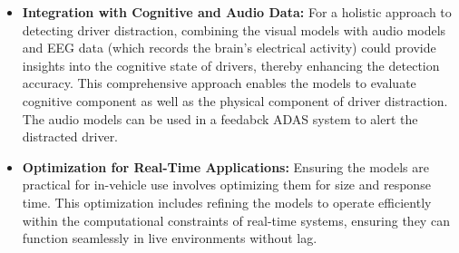 \begin{itemize}
    \item \textbf{Integration with Cognitive and Audio Data:} For a holistic approach to detecting driver distraction, combining the visual models with audio models and EEG data (which records the brain's electrical activity) could provide insights into the cognitive state of drivers, thereby enhancing the detection accuracy. This comprehensive approach enables the models to evaluate cognitive component as well as the physical component of driver distraction. The audio models can be used in a feedabck ADAS system to alert the distracted driver.

    \item \textbf{Optimization for Real-Time Applications:} Ensuring the models are practical for in-vehicle use involves optimizing them for size and response time. This optimization includes refining the models to operate efficiently within the computational constraints of real-time systems, ensuring they can function seamlessly in live environments without lag.
\end{itemize}